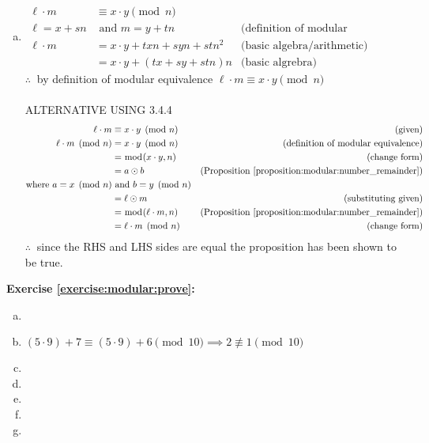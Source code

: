 \begin{enumerate}[(a)]
\item 
\begin{align*}
\ell \cdot m &\equiv x \cdot y \pmod{n}\\
\ell = x + sn &\text{\ and\ } m = y + tn  &\text{(definition of modular equivalence)}\\
\ell \cdot m &= x\cdot y + txn + syn + stn^{2} &\text{(basic algebra/arithmetic)}\\
&=x\cdot y + (tx+sy+stn)n &\text{(basic algrebra)}
\end{align*}
$\therefore\ $ by definition of modular equivalence $\ell\cdot m \equiv x\cdot y \pmod{n}$\\
\\
ALTERNATIVE USING 3.4.4
\begin{align*} 
\ell \cdot m &\equiv x \cdot y\pmod{n} &\text{(given)}\\
\ell \cdot m \pmod{n} &= x \cdot y\pmod{n}  &\text{(definition of modular equivalence)}\\
&= \bmod(x \cdot y, n)  &\text{(change form)}\\
&= a \odot b &\text{(Proposition~\ref{proposition:modular:number_remainder})}\\
\text{where\ } a = x\pmod{n} &\text{\ and\ } b = y\pmod{n}\\
&= \ell \odot m &\text{(substituting given)}\\
&= \bmod(\ell \cdot m, n) &\text{(Proposition~\ref{proposition:modular:number_remainder})}\\
&= \ell \cdot m\pmod{n} &\text{(change form)}
\end{align*}
$\therefore\ $ since the RHS and LHS sides are equal the proposition has been shown to be true.
\end{enumerate}

\noindent\textbf{Exercise \ref{exercise:modular:prove}:} 
\begin{enumerate}[(a)]
\item
\item
$(5 \cdot 9)+7 \equiv (5 \cdot 9)+6 \pmod{10} \implies 2 \not\equiv 1 \pmod{10}$

\item
\item
\item
\item
\item
\end{enumerate}

